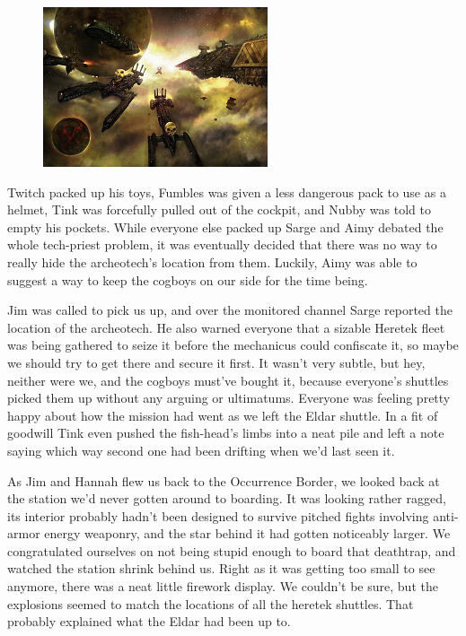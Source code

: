 \begin{figure}
	\begin{center}
		\includegraphics[width=\figwidth]{pics/11/63.png}
	\end{center}
\end{figure}
Twitch packed up his toys, Fumbles was given a less dangerous pack to use as a helmet, Tink was forcefully pulled out of the cockpit, and Nubby was told to empty his pockets. 
While everyone else packed up Sarge and Aimy debated the whole tech-priest problem, it was eventually decided that there was no way to really hide the archeotech's location from them. 
Luckily, Aimy was able to suggest a way to keep the cogboys on our side for the time being.

Jim was called to pick us up, and over the monitored channel Sarge reported the location of the archeotech. 
He also warned everyone that a sizable Heretek fleet was being gathered to seize it before the mechanicus could confiscate it, so maybe we should try to get there and secure it first. 
It wasn't very subtle, but hey, neither were we, and the cogboys must've bought it, because everyone's shuttles picked them up without any arguing or ultimatums. 
Everyone was feeling pretty happy about how the mission had went as we left the Eldar shuttle. 
In a fit of goodwill Tink even pushed the fish-head's limbs into a neat pile and left a note saying which way second one had been drifting when we'd last seen it.

As Jim and Hannah flew us back to the Occurrence Border, we looked back at the station we'd never gotten around to boarding. 
It was looking rather ragged, its interior probably hadn't been designed to survive pitched fights involving anti-armor energy weaponry, and the star behind it had gotten noticeably larger. 
We congratulated ourselves on not being stupid enough to board that deathtrap, and watched the station shrink behind us. 
Right as it was getting too small to see anymore, there was a neat little firework display. 
We couldn't be sure, but the explosions seemed to match the locations of all the heretek shuttles. 
That probably explained what the Eldar had been up to.

